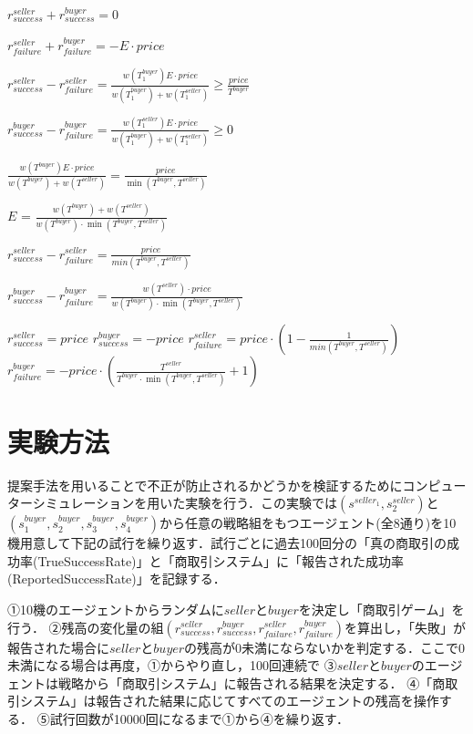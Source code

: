 \documentclass[twocolumn, a4j]{article}
\begin{document}
$ r^{seller}_{success}+r^{buyer}_{success} = 0 $

$ r^{seller}_{failure}+r^{buyer}_{failure} = -E \cdot price $

$ r^{seller}_{success} - r^{seller}_{failure} = \frac{w(T^{buyer}_1)E \cdot price}{w(T^{buyer}_1) + w(T^{seller}_1)} \geq \frac{price}{T^{buyer}} $

$ r^{buyer}_{success} - r^{buyer}_{failure} = \frac{w(T^{seller}_1)E \cdot price}{w(T^{buyer}_1) + w(T^{seller}_1)} \geq 0 $

$ \frac{w(T^{buyer})E \cdot price}{w(T^{buyer}) + w(T^{seller})} = \frac{price}{\min(T^{buyer}, T^{seller})} $

$ E $ = $ \frac{w(T^{buyer})+w(T^{seller})}{w(T^{buyer}) \cdot \min(T^{buyer}, T^{seller})} $

$ r^{seller}_{success}-r^{seller}_{failure} = \frac{price}{min(T^{buyer}, T^{seller})} $

$ r^{buyer}_{success} - r^{buyer}_{failure} = \frac{w(T^{seller}) \cdot price}{w(T^{buyer}) \cdot \min(T^{buyer}, T^{seller})} $


$ r^{seller}_{success} = price $
$ r^{buyer}_{success} = -price $
$ r^{seller}_{failure} = price \cdot (1 - \frac{1}{min(T^{buyer}, T^{seller})}) $
$ r^{buyer}_{failure} = - price \cdot (\frac{T^{seller}}{T^{buyer} \cdot \min(T^{buyer}, T^{seller})} + 1) $

\twocolumn

\section{実験方法}
提案手法を用いることで不正が防止されるかどうかを検証するためにコンピューターシミュレーションを用いた実験を行う．この実験では$ (s^{seller_1}, s^{seller}_2) $と$ (s^{buyer}_1, s^{buyer}_2, s^{buyer}_3, s^{buyer}_4) $から任意の戦略組をもつエージェント(全8通り)を10機用意して下記の試行を繰り返す．試行ごとに過去100回分の「真の商取引の成功率(TrueSuccessRate)」と「商取引システム」に「報告された成功率(ReportedSuccessRate)」を記録する．

①10機のエージェントからランダムに$ seller $と$ buyer $を決定し「商取引ゲーム」を行う．
②残高の変化量の組$ (r^{seller}_{success}, r^{buyer}_{success}, r^{seller}_{failure}, r^{buyer}_{failure}) $を算出し，「失敗」が報告された場合に$ seller $と$ buyer $の残高が0未満にならないかを判定する．ここで0未満になる場合は再度，①からやり直し，100回連続で
③$ seller $と$ buyer $のエージェントは戦略から「商取引システム」に報告される結果を決定する．
④「商取引システム」は報告された結果に応じてすべてのエージェントの残高を操作する．
⑤試行回数が10000回になるまで①から④を繰り返す．
\end{document}

